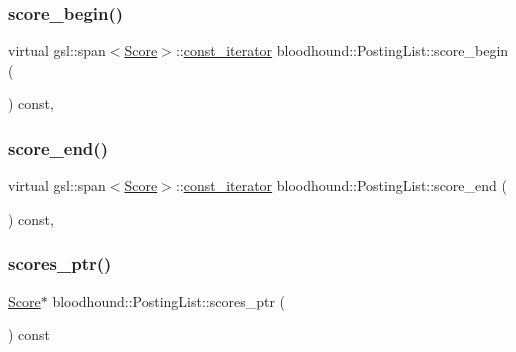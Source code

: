 \mbox{\label{classbloodhound_1_1PostingList_aec5d5bb81622fb64d7b64416a8491456}} 
\subsubsection{\texorpdfstring{score\+\_\+begin()}{score\_begin()}}
{\footnotesize\ttfamily virtual gsl\+::span$<$\hyperlink{structbloodhound_1_1Score}{Score}$>$\+::\hyperlink{structbloodhound_1_1PostingList_1_1const__iterator}{const\+\_\+iterator} bloodhound\+::\+Posting\+List\+::score\+\_\+begin (\begin{DoxyParamCaption}{ }\end{DoxyParamCaption}) const\hspace{0.3cm}{\ttfamily [inline]}, {\ttfamily [virtual]}}

\mbox{\label{classbloodhound_1_1PostingList_ae89abf9882f73f35a6e106c5a328ca6f}} 
\subsubsection{\texorpdfstring{score\+\_\+end()}{score\_end()}}
{\footnotesize\ttfamily virtual gsl\+::span$<$\hyperlink{structbloodhound_1_1Score}{Score}$>$\+::\hyperlink{structbloodhound_1_1PostingList_1_1const__iterator}{const\+\_\+iterator} bloodhound\+::\+Posting\+List\+::score\+\_\+end (\begin{DoxyParamCaption}{ }\end{DoxyParamCaption}) const\hspace{0.3cm}{\ttfamily [inline]}, {\ttfamily [virtual]}}

\mbox{\label{classbloodhound_1_1PostingList_a79be9c874bb91e17ca308ae0528e9277}} 
\subsubsection{\texorpdfstring{scores\+\_\+ptr()}{scores\_ptr()}}
{\footnotesize\ttfamily \hyperlink{structbloodhound_1_1Score}{Score}$\ast$ bloodhound\+::\+Posting\+List\+::scores\+\_\+ptr (\begin{DoxyParamCaption}{ }\end{DoxyParamCaption}) const\hspace{0.3cm}{\ttfamily [inline]}}



